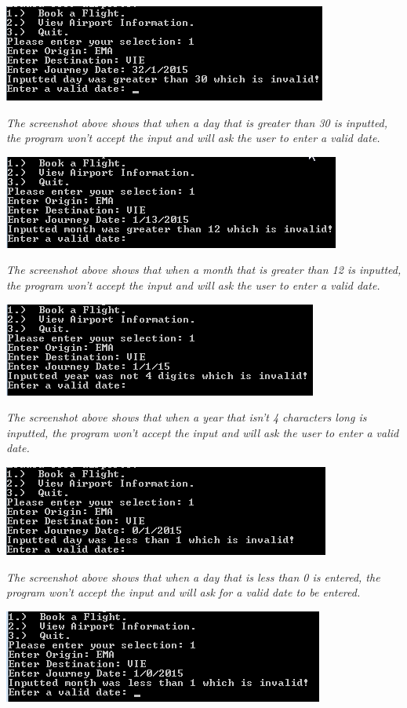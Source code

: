 \documentclass[10pt, a4paper]{article}
\begin{document}
\includegraphics{Validation9.png}

\textit{The screenshot above shows that when a day that is greater than 30 is inputted, the program won't accept the input and will ask the user to enter a valid date.}

\includegraphics{Validation10.png}

\textit{The screenshot above shows that when a month that is greater than 12 is inputted, the program won't accept the input and will ask the user to enter a valid date.}

\includegraphics{Validation11.png}

\textit{The screenshot above shows that when a year that isn't 4 characters long is inputted, the program won't accept the input and will ask the user to enter a valid date.}

\includegraphics{Validation12.png}

\textit{The screenshot above shows that when a day that is less than 0 is entered, the program won't accept the input and will ask for a valid date to be entered.}

\includegraphics{Validation13.png}
\end{document}
